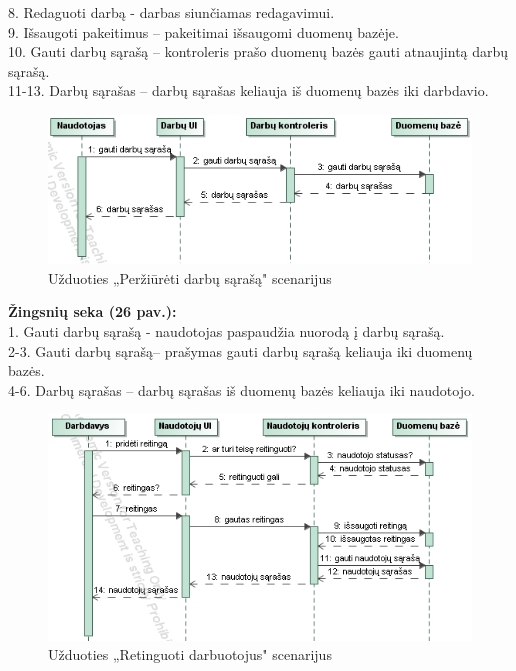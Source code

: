 \documentclass{VUMIFPSkursinis}
\begin{document}
	8. Redaguoti darbą - darbas siunčiamas redagavimui. \\
	9. Išsaugoti pakeitimus – pakeitimai išsaugomi duomenų bazėje.\\
	10. Gauti darbų sąrašą – kontroleris prašo duomenų bazės gauti atnaujintą darbų sąrašą.\\
	11-13. Darbų sąrašas – darbų sąrašas keliauja iš duomenų bazės iki darbdavio.
%
\begin{figure}[H]
\centering
\includegraphics[width=\linewidth, frame]{img/seku(gautisarasa).png}
\caption{Užduoties „Peržiūrėti darbų sąrašą" scenarijus}
\end{figure}
	\textbf{Žingsnių seka (26 pav.):}\\
	1. Gauti darbų sąrašą -  naudotojas paspaudžia nuorodą į darbų sąrašą.\\
	2-3. Gauti darbų sąrašą– prašymas gauti darbų sąrašą keliauja iki duomenų bazės.\\
	4-6. Darbų sąrašas – darbų sąrašas iš duomenų bazės keliauja iki naudotojo.
%
\begin{figure}[H]
\centering
\includegraphics[width=\linewidth, frame]{img/seku(reitinguotidarbuotoja).png}
\caption{Užduoties „Retinguoti darbuotojus" scenarijus}
\end{figure}
\end{document}

